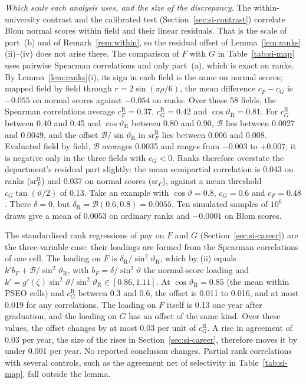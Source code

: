 \documentclass[11pt]{article}
\begin{document}
\emph{Which scale each analysis uses, and the size of the discrepancy.} The within-university contrast and the
calibrated test (Section~\ref{sec:si-contrast}) correlate Blom normal scores within field and their linear
residuals. That is the scale of part~(b) and of Remark~\ref{rem:within}, so the residual offset of
Lemma~\ref{lem:ranks}(ii)--(iv) does not arise there. The comparison of $F$ with $G$ in Table~\ref{tab:si-map} uses
pairwise Spearman
correlations and only part~(a), which is exact on ranks. By Lemma~\ref{lem:ranks}(i), its sign in each field is the
same on normal scores; mapped field by field through $r=2\sin(\pi\rho/6)$, the mean difference $c_F-c_G$ is
$-0.055$ on normal scores against $-0.054$ on ranks. Over these 58 fields, the Spearman correlations average
$c^{\mathrm R}_F=0.37$, $c^{\mathrm R}_G=0.42$ and $\cos\vartheta_{\mathrm R}=0.81$. For $c^{\mathrm R}_G$ between
0.40 and 0.45 and $\cos\vartheta_{\mathrm R}$ between 0.80 and 0.90, $\mathcal B$ lies between 0.0027 and 0.0049, and the offset
$\mathcal B/\sin\vartheta_{\mathrm R}$ in $\mathrm{sr}^{\mathrm R}_F$ lies between 0.006 and 0.008. Evaluated field by field, $\mathcal B$
averages 0.0035 and ranges from $-0.003$ to $+0.007$; it is negative only in the three fields with $c_G<0$. Ranks
therefore overstate the department's residual part slightly: the mean semipartial correlation is 0.043 on ranks
($\mathrm{sr}^{\mathrm R}_F$) and 0.037 on normal scores ($\mathrm{sr}_F$), against a mean threshold $c_G\tan(\vartheta/2)$ of 0.13. Take an example with $\cos\vartheta=0.8$,
$c_G=0.6$ and $c_F=0.48$. There $\delta=0$, but $\delta_{\mathrm R}=\mathcal B(0.6,0.8)=0.0055$. Ten simulated samples of $10^6$
draws give a mean of 0.0053 on ordinary ranks and $-0.0001$ on Blom scores.

The standardised rank regressions of pay on $F$ and $G$ (Section~\ref{sec:si-career}) are the three-variable case:
their loadings are formed from the Spearman correlations of one cell. The loading on $F$ is
$\delta_{\mathrm R}/\sin^2\vartheta_{\mathrm R}$, which by (ii) equals $k'b_F+\mathcal B/\sin^2\vartheta_{\mathrm R}$,
with $b_F=\delta/\sin^2\vartheta$ the normal-score loading and $k'=g'(\zeta)\sin^2\vartheta/\sin^2\vartheta_{\mathrm R}
\in[0.86,1.11]$. At $\cos\vartheta_{\mathrm R}=0.85$ (the mean within
PSEO cells) and $c^{\mathrm R}_G$ between 0.3 and 0.6, the offset is 0.011 to 0.016, and at most 0.019 for any
correlations. The loading on $F$ itself is 0.13 one year after graduation, and the loading on $G$ has an offset of the
same kind. Over these values, the offset changes by at most 0.03 per unit of $c^{\mathrm R}_G$. A rise in agreement of
0.03 per year, the size of the rises in Section~\ref{sec:si-career}, therefore moves it by under 0.001 per year. No
reported conclusion changes. Partial rank correlations with several controls, such as the agreement net of
selectivity in Table~\ref{tab:si-map}, fall outside the lemma.
\end{document}
